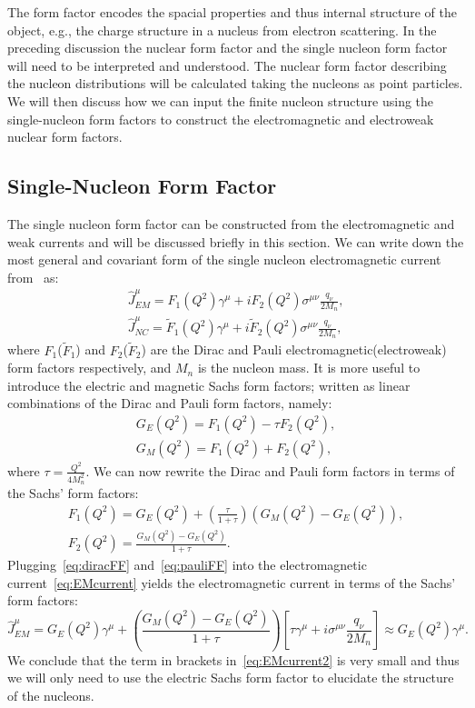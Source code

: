 The form factor encodes the spacial properties and thus internal structure of the object, e.g., the charge structure in a nucleus from electron scattering. In the preceding discussion the nuclear form factor and the single nucleon form factor will need to be interpreted and understood. The nuclear form factor describing the nucleon distributions will be calculated taking the nucleons as point particles. We will then discuss how we can input the finite nucleon structure using the single-nucleon form factors to construct the electromagnetic and electroweak nuclear form factors.

\subsection{Single-Nucleon Form Factor}
\label{sec:nucleonff}

The single nucleon form factor can be constructed from the electromagnetic and weak currents and will be discussed briefly in this section. We can write down the most general and covariant form of the single nucleon electromagnetic current from~\cite{horowitz:2012:impact} as:
\begin{gather}
\hat{J}^{\mu}_{EM} = F_1(Q^2)\gamma ^{\mu} +iF_2(Q^2)\sigma ^{\mu \nu}\frac{q_{\nu}}{2M_n},\label{eq:EMcurrent} \\
\hat{J}^{\mu}_{NC} = \widetilde{F}_1(Q^2)\gamma ^{\mu} +i\tilde{F}_2(Q^2)\sigma ^{\mu \nu}\frac{q_{\nu}}{2M_n},
\end{gather}
where $F_1$($\tilde{F}_1$) and $F_2$($\tilde{F}_2$) are the Dirac and Pauli electromagnetic(electroweak) form factors respectively, and $M_n$ is the nucleon mass. It is more useful to introduce the electric and magnetic Sachs form factors; written as linear combinations of the Dirac and Pauli form factors, namely:
\begin{gather}
G_E(Q^2)=F_1(Q^2)-\tau F_2(Q^2), \\
G_M(Q^2)=F_1(Q^2)+F_2(Q^2),
\end{gather}
where $\tau = \frac{Q^2}{4M_n^2}$. We can now rewrite the Dirac and Pauli form factors in terms of the Sachs' form factors:
\begin{gather}
F_1(Q^2)=G_E(Q^2) + \left( \frac{\tau}{1+\tau} \right)(G_M(Q^2) - G_E(Q^2)),\label{eq:diracFF} \\
F_2(Q^2)=\frac{G_M(Q^2)-G_E(Q^2)}{1+\tau}.\label{eq:pauliFF}
\end{gather} 
Plugging~\eqref{eq:diracFF} and~\eqref{eq:pauliFF} into the electromagnetic current~\eqref{eq:EMcurrent} yields the electromagnetic current in terms of the Sachs' form factors:
\begin{equation}
\hat{J}^{\mu}_{EM}=G_E(Q^2)\gamma ^{\mu} + \left( \frac{G_M(Q^2)-G_E(Q^2)}{1+\tau} \right) \left[ \tau \gamma ^{\mu} + i\sigma^{\mu \nu} \frac{q_{\nu}}{2M_n} \right] \approx G_E(Q^2)\gamma ^{\mu}.\label{eq:EMcurrent2}
\end{equation}
We conclude that the term in brackets in~\eqref{eq:EMcurrent2} is very small and thus we will only need to use the electric Sachs form factor to elucidate the structure of the nucleons. 

